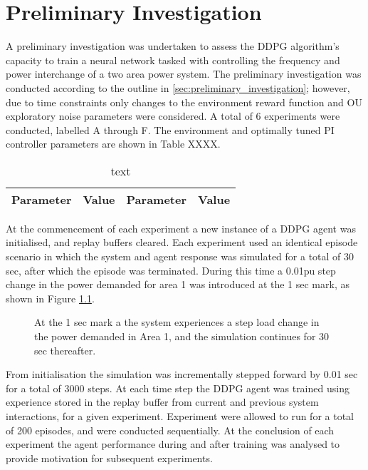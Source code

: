 \chapter{Preliminary Investigation}
A preliminary investigation was undertaken to assess the DDPG algorithm's capacity to train a neural network tasked with controlling the frequency and power interchange of a two area power system. The preliminary investigation was conducted according to the outline in \textsection \ref{sec:preliminary_investigation}; however, due to time constraints only changes to the environment reward function and OU exploratory noise parameters were considered. A total of 6 experiments were conducted, labelled A through F. The environment and optimally tuned PI controller parameters are shown in Table XXXX.
\begin{table}[h]
	\centering
	\caption{text}
	\begin{tabular}{lrlr}
		\toprule
		\textbf{Parameter} & \textbf{Value} & \textbf{Parameter} & \textbf{Value} \\
		\midrule
		
		\bottomrule
	\end{tabular}
\end{table}

At the commencement of each experiment a new instance of a DDPG agent was initialised, and replay buffers cleared. Each experiment used an identical episode scenario in which the system and agent response was simulated for a total of 30 sec, after which the episode was terminated. During this time a 0.01pu step change in the power demanded for area 1 was introduced at the 1 sec mark, as shown in Figure \ref{fig:5001_demand_profile}.
\begin{figure}[h]
	\centering
	
	\caption{At the 1 sec mark a the system experiences a step load change in the power demanded in Area 1, and the simulation continues for 30 sec thereafter.}
	\label{fig:5001_demand_profile}
\end{figure}

From initialisation the simulation was incrementally stepped forward by 0.01 sec for a total of 3000 steps. At each time step the DDPG agent was trained using experience stored in the replay buffer from current and previous system interactions, for a given experiment. Experiment were allowed to run for a total of 200 episodes, and were conducted sequentially. At the conclusion of each experiment the agent performance during and after training was analysed to provide motivation for subsequent experiments.

